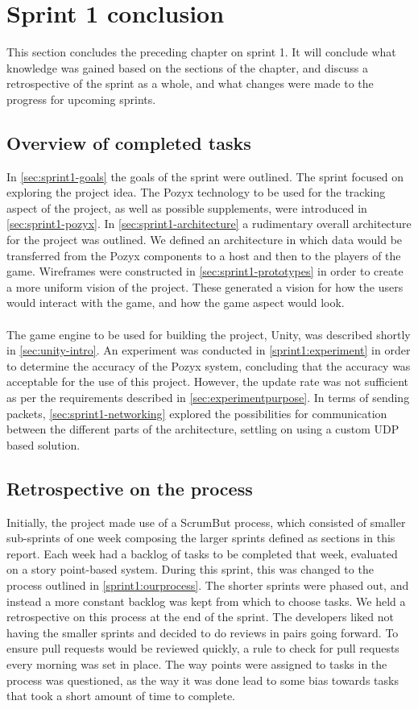 \section{Sprint 1 conclusion}\label{sec:sprint1-conclusion}
This section concludes the preceding chapter on sprint 1.
It will conclude what knowledge was gained based on the sections of the chapter, and discuss a retrospective of the sprint as a whole, and what changes were made to the progress for upcoming sprints.

\subsection{Overview of completed tasks}
In \autoref{sec:sprint1-goals} the goals of the sprint were outlined.
The sprint focused on exploring the project idea.
The Pozyx technology to be used for the tracking aspect of the project, as well as possible supplements, were introduced in \autoref{sec:sprint1-pozyx}.
In \autoref{sec:sprint1-architecture} a rudimentary overall architecture for the project was outlined.
We defined an architecture in which data would be transferred from the Pozyx components to a host and then to the players of the game.
Wireframes were constructed in \autoref{sec:sprint1-prototypes} in order to create a more uniform vision of the project.
These generated a vision for how the users would interact with the game, and how the game aspect would look.
\\\\
The game engine to be used for building the project, Unity, was described shortly in \autoref{sec:unity-intro}.
An experiment was conducted in \autoref{sprint1:experiment} in order to determine the accuracy of the Pozyx system, concluding that the accuracy was acceptable for the use of this project.
However, the update rate was not sufficient as per the requirements described in \autoref{sec:experimentpurpose}.
In terms of sending packets, \autoref{sec:sprint1-networking} explored the possibilities for communication between the different parts of the architecture, settling on using a custom UDP based solution.

\subsection{Retrospective on the process}
Initially, the project made use of a ScrumBut process, which consisted of smaller sub-sprints of one week composing the larger sprints defined as sections in this report.
Each week had a backlog of tasks to be completed that week, evaluated on a story point-based system.
During this sprint, this was changed to the process outlined in \ref{sprint1:ourprocess}.
The shorter sprints were phased out, and instead a more constant backlog was kept from which to choose tasks.
We held a retrospective on this process at the end of the sprint.
The developers liked not having the smaller sprints and decided to do reviews in pairs going forward.
To ensure pull requests would be reviewed quickly, a rule to check for pull requests every morning was set in place.
The way points were assigned to tasks in the process was questioned, as the way it was done lead to some bias towards tasks that took a short amount of time to complete.